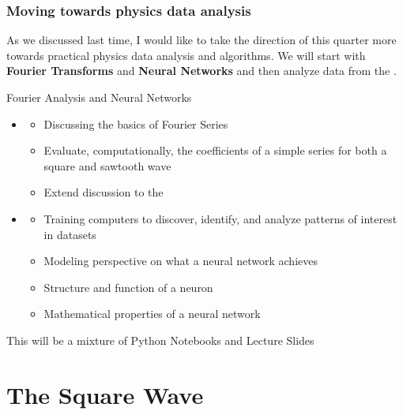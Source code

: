 \documentclass[hyperref={colorlinks=true}]{beamer}
\begin{document}
\begin{frame}%
  \frametitle{Moving towards physics data analysis}

  As we discussed last time, I would like to take the direction of this quarter more towards practical physics data analysis and algorithms. We will start with \textbf{Fourier Transforms} and \textbf{Neural Networks} and then analyze data from the .
  
  \vspace{0.3cm}
  
  \begin{ucblock}{Fourier Analysis and Neural Networks}
    \begin{itemize}
      \item {} 
      \begin{itemize}
        \item Discussing the basics of Fourier Series 
        \item Evaluate, computationally, the coefficients of a simple series for both a square and sawtooth wave
        \item Extend discussion to the 
      \end{itemize}
      \item {} 
      \begin{itemize}
        \item Training computers to discover, identify, and analyze patterns of interest in datasets 
        \item Modeling perspective on what a neural network achieves
        \item Structure and function of a neuron
        \item Mathematical properties of a neural network
      \end{itemize}
    \end{itemize}
  \end{ucblock}
  
  \mysp
  
  This will be a mixture of Python Notebooks and Lecture Slides

\end{frame}


\section[The Square Wave]{The Square Wave}
\end{document}
